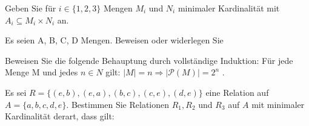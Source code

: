 \documentclass[10pt, a4paper]{exam}
\begin{document}
\begin{questions}
    \question Geben Sie für $i\in\{1, 2, 3\}$ Mengen $M_i$ und $N_i$ minimaler Kardinalität mit $A_i\subseteq M_i \times N_i$ an.

    \question Es seien A, B, C, D Mengen. Beweisen oder widerlegen Sie

    \question Beweisen Sie die folgende Behauptung durch vollständige Induktion: Für jede Menge M und jedes $n\in N$ gilt: $|M| = n\Rightarrow |\mathcal{P}(M)| = 2^n$ .

    \question Es sei $R=\{(e, b), (e, a), (b, c), (c, e), (d, e)\}$ eine Relation auf $A=\{a, b, c, d, e\}$. Bestimmen Sie Relationen $R_1 , R_2$ und $R_3$ auf $A$ mit minimaler Kardinalität derart, dass gilt:
\end{questions}
\end{document}
